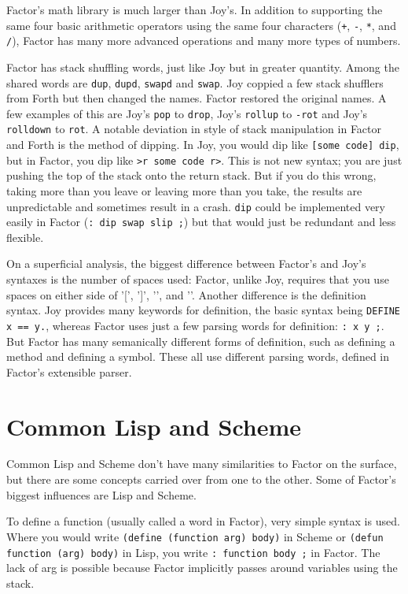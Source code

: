 \documentclass{article}
\begin{document}
Factor's math library is much larger than Joy's. In addition to supporting the same four basic arithmetic operators using the same four characters (\texttt{+}, \texttt{-}, \texttt{*}, and \texttt{/}), Factor has many more advanced operations and many more types of numbers.

Factor has stack shuffling words, just like Joy but in greater quantity. Among the shared words are \texttt{dup}, \texttt{dupd}, \texttt{swapd} and \texttt{swap}. Joy coppied a few stack shufflers from Forth but then changed the names. Factor restored the original names. A few examples of this are Joy's \texttt{pop} to \texttt{drop}, Joy's \texttt{rollup} to \texttt{-rot} and Joy's \texttt{rolldown} to \texttt{rot}. A notable deviation in style of stack manipulation in Factor and Forth is the method of dipping. In Joy, you would dip like \verb|[some code] dip|, but in Factor, you dip like \verb|>r some code r>|. This is not new syntax; you are just pushing the top of the stack onto the return stack. But if you do this wrong, taking more than you leave or leaving more than you take, the results are unpredictable and sometimes result in a crash. \texttt{dip} could be implemented very easily in Factor (\verb|: dip swap slip ;|) but that would just be redundant and less flexible.

On a superficial analysis, the biggest difference between Factor's and Joy's syntaxes is the number of spaces used: Factor, unlike Joy, requires that you use spaces on either side of '[', ']', '{', and '}'. Another difference is the definition syntax. Joy provides many keywords for definition, the basic syntax being \verb|DEFINE x == y.|, whereas Factor uses just a few parsing words for definition: \verb|: x y ;|. But Factor has many semanically different forms of definition, such as defining a method and defining a symbol. These all use different parsing words, defined in Factor's extensible parser.

\section{Common Lisp and Scheme}

Common Lisp and Scheme don't have many similarities to Factor on the surface, but there are some concepts carried over from one to the other. Some of Factor's biggest influences are Lisp and Scheme.

To define a function (usually called a word in Factor), very simple syntax is used. Where you would write \verb|(define (function arg) body)| in Scheme or \verb|(defun function (arg) body)| in Lisp, you write \verb|: function body ;| in Factor. The lack of arg is possible because Factor implicitly passes around variables using the stack.
\end{document}
